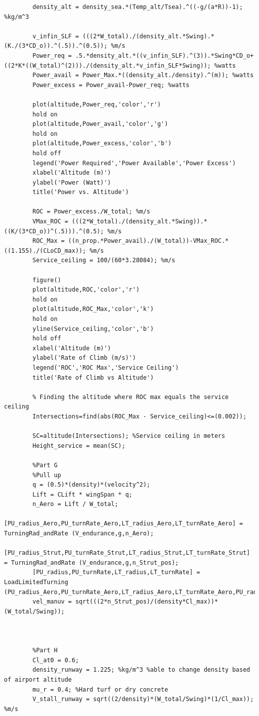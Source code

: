 \documentclass[12pt,A4paper]{article}
\begin{document}
\begin{lstlisting}
		density_alt = density_sea.*(Temp_alt/Tsea).^((-g/(a*R))-1); %kg/m^3
		
		v_infin_SLF = (((2*W_total)./(density_alt.*Swing).*(K./(3*CD_o)).^(.5)).^(0.5)); %m/s
		Power_req = .5.*density_alt.*((v_infin_SLF).^(3)).*Swing*CD_o+((2*K*((W_total)^(2)))./(density_alt.*v_infin_SLF*Swing)); %watts
		Power_avail = Power_Max.*((density_alt./density).^(m)); %watts
		Power_excess = Power_avail-Power_req; %watts
		
		plot(altitude,Power_req,'color','r')
		hold on
		plot(altitude,Power_avail,'color','g')
		hold on
		plot(altitude,Power_excess,'color','b')
		hold off
		legend('Power Required','Power Available','Power Excess')
		xlabel('Altitude (m)')
		ylabel('Power (Watt)')
		title('Power vs. Altitude')
		
		ROC = Power_excess./W_total; %m/s
		VMax_ROC = (((2*W_total)./(density_alt.*Swing)).*((K/(3*CD_o))^(.5))).^(0.5); %m/s
		ROC_Max = ((n_prop.*Power_avail)./(W_total))-VMax_ROC.*((1.155)./(CLoCD_max)); %m/s
		Service_ceiling = 100/(60*3.28084); %m/s
		
		figure()
		plot(altitude,ROC,'color','r')
		hold on
		plot(altitude,ROC_Max,'color','k')
		hold on
		yline(Service_ceiling,'color','b')
		hold off
		xlabel('Altitude (m)')
		ylabel('Rate of Climb (m/s)')
		legend('ROC','ROC Max','Service Ceiling')
		title('Rate of Climb vs Altitude')
		
		% Finding the altitude where ROC max equals the service ceiling
		Intersections=find(abs(ROC_Max - Service_ceiling)<=(0.002));
		
		SC=altitude(Intersections); %Service ceiling in meters
		Height_service = mean(SC);
		
		%Part G
		%Pull up
		q = (0.5)*(density)*(velocity^2);
		Lift = CLift * wingSpan * q;
		n_Aero = Lift / W_total;
		[PU_radius_Aero,PU_turnRate_Aero,LT_radius_Aero,LT_turnRate_Aero] = TurningRad_andRate (V_endurance,g,n_Aero);
		[PU_radius_Strut,PU_turnRate_Strut,LT_radius_Strut,LT_turnRate_Strut] = TurningRad_andRate (V_endurance,g,n_Strut_pos);
		[PU_radius,PU_turnRate,LT_radius,LT_turnRate] = LoadLimitedTurning (PU_radius_Aero,PU_turnRate_Aero,LT_radius_Aero,LT_turnRate_Aero,PU_radius_Strut,PU_turnRate_Strut,LT_radius_Strut,LT_turnRate_Strut);
		vel_manuv = sqrt(((2*n_Strut_pos)/(density*Cl_max))*(W_total/Swing));
		
		
		
		%Part H
		Cl_at0 = 0.6;
		density_runway = 1.225; %kg/m^3 %able to change density based of airport altitude
		mu_r = 0.4; %Hard turf or dry concrete
		V_stall_runway = sqrt((2/density)*(W_total/Swing)*(1/Cl_max)); %m/s
		

\end{lstlisting}
\end{document}

